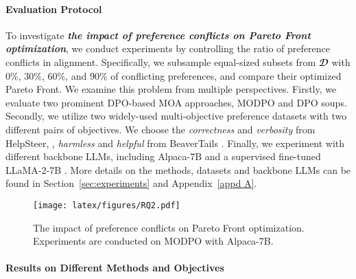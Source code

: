 \paragraph{Evaluation Protocol}
To investigate \textbf{\textit{the impact of preference conflicts on Pareto Front optimization}}, we conduct experiments by controlling the ratio of preference conflicts in alignment. Specifically, we subsample equal-sized subsets from $\mathbfcal{D}$ with 0\%, 30\%, 60\%, and 90\% of conflicting preferences, and compare their optimized Pareto Front.
We examine this problem from multiple perspectives. 
Firstly, we evaluate two prominent DPO-based MOA approaches, MODPO and DPO soups.
Secondly, we utilize two widely-used multi-objective preference datasets with two different pairs of objectives. 
We choose the \textit{correctness} and \textit{verbosity} from HelpSteer,  \cite{DBLP:conf/acl/WangLXYDQZZ24}, \textit{harmless} and \textit{helpful} from BeaverTails \cite{DBLP:conf/nips/JiLDPZB0SW023}. 
Finally, we experiment with different backbone LLMs, including Alpaca-7B \cite{alpaca} and a supervised fine-tuned LLaMA-2-7B \cite{DBLP:journals/corr/abs-2307-09288}. More details on the methods, datasets and backbone LLMs can be found in Section~\ref{sec:experiments} and Appendix~\ref{appd A}. 

\begin{figure}[t]
 \setlength{\abovecaptionskip}{0.05cm}
 \setlength{\belowcaptionskip}{0cm}
    \centering
    \texttt{[image: latex/figures/RQ2.pdf]}
    \caption{The impact of preference conflicts on Pareto Front optimization. Experiments are conducted on MODPO with Alpaca-7B. }
    \label{fig:RQ2}
\end{figure}


\paragraph{Results on Different Methods and Objectives}


